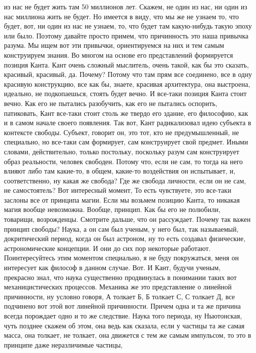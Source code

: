 из нас не будет жить там 50 миллионов лет. Скажем, не один из нас, ни один из
нас миллиона жить не будет. Но имеется в виду, что мы же не узнаем то, что
будет, вот, ни один из нас не узнаем, то, что будет там какую-нибудь такую эпоху
или было. Поэтому давайте просто примем, что причинность это наша привычка
разума. Мы ищем вот эти привычки, ориентируемся на них и тем самым конструируем
знания. Во многом на основе его представлений формируется позиция Канта. Кант
очень сложный мыслитель, очень такой, как бы это сказать, красивый, красивый,
да. Почему? Потому что там прям все соединено, все в одну красивую конструкцию,
все как бы, знаете, красивая архитектура, она выстроена, идеально, не
подкопаешься, стоять будет вечно. И все-таки позиция Канта стоит вечно. Как его
не пытались разобучить, как его не пытались оспорить, патиковать, Кант все-таки
стоит столь же твердо его здание, его философию, как и в самом начале своего
появления. Так вот, Кант радикализовал идею субъекта в контексте свободы.
Субъект, говорит он, это тот, кто не предумышленный, не специально, но все-таки
сам формирует, сам конструирует свой предмет. Иными словами, действительно,
только постольку, поскольку разум сам конструирует образ реальности, человек
свободен. Потому что, если не сам, то тогда на него влияют либо там какие-то, в
общем, какие-то воздействия он испытывает, и, соответственно, ну какая же
свобода? Где же свобода личности, если он не сам, не самостоятель? Вот
интересный момент, То есть чувствуете, это все-таки заслоны все от принципа
магии. Если мы возьмем позицию Канта, то никакая магия вообще невозможна.
Вообще, принцип. Как бы его не полюбили, товарищи, возрожденцы. Смотрите дальше,
что он рассуждает. Почему так важен принцип свободы? Наука, а он сам был ученым,
у него был, так называемый, докритический период, когда он был астроном, ну то
есть создавал физические, астрономические концепции. И они до сих пор некоторые
работают. Поинтересуйтесь этим моментом специально, я не буду покружаться, меня
он интересует как философ в данном случае. Вот. И Кант, будучи ученым, прекрасно
знал, что наука существенно продвинулась в понимании таких вот механицистических
процессов. Механика же это представление о линейной причинности, ну условно
говоря, А толкает Б, Б толкает С, С толкает Д, все подчинено вот этой вот
линейной причинности. Причем одна и та же причина всегда порождает одно и то же
следствие. Наука того периода, ну Ньютонская, чуть позднее скажем об этом, она
ведь как сказала, если у частицы та же самая масса, она толкает, не толкает, она
движется с тем же самым импульсом, то это в принципе даже неразличимые частицы,
